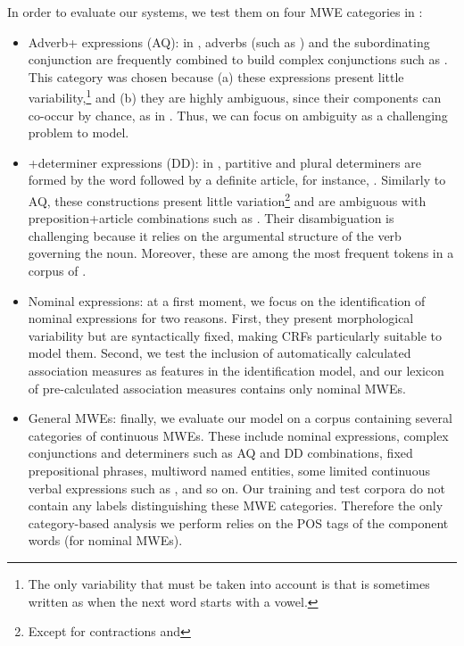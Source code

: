 \documentclass[output=paper,
modfonts
]{langscibook}
\begin{document}
In order to evaluate our systems, we test them on four MWE categories in :

\begin{itemize}
\item Adverb+ expressions (AQ): in , adverbs (such as ) and the subordinating conjunction  are frequently combined to build complex conjunctions such as . This category was chosen because (a) these expressions present little variability,\footnote{The only variability that must be taken into account is that  is sometimes written as  when the next word starts with a vowel.} and (b) they are highly ambiguous, since their components can co-occur by chance, as in . Thus, we can focus on ambiguity as a challenging problem to model.
\item {}+determiner expressions (DD): in , partitive and plural determiners are formed by the word  followed by a definite article, for instance, . Similarly to AQ, these constructions present little variation\footnote{Except for contractions  and } and are ambiguous with preposition+article combinations such as . Their disambiguation is challenging because it relies on the argumental structure of the verb governing the noun. Moreover, these are among the most frequent tokens in a corpus of  \citep{nasr:acl:2015}.
\item Nominal expressions: at a first moment, we focus on the identification of nominal expressions for two reasons. First, they present morphological variability but are syntactically fixed, making CRFs particularly suitable to model them. Second, we test the inclusion of automatically calculated association measures as features in the identification model, and our lexicon of pre-calculated association measures contains only nominal MWEs.
\item General MWEs: finally, we evaluate our model on a corpus containing several categories of continuous MWEs. These include nominal expressions, complex conjunctions and determiners such as AQ and DD combinations, fixed prepositional phrases, multiword named entities, some limited continuous verbal expressions such as , and so on. Our training and test corpora do not contain any labels distinguishing these MWE categories. Therefore the only category-based analysis we perform relies on the POS tags of the component words (for nominal MWEs).
\end{itemize}
\end{document}
